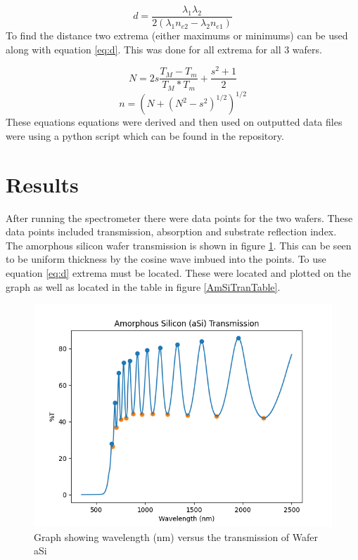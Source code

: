 \documentclass[10pt,a4paper]{article}
\begin{document}
\begin{multicols}{2}
\begin{equation}
\label{eq:d}
d = \frac{\lambda_1 \lambda_2}{2(\lambda_1 n_{e2} - \lambda_2 n_{e1})}
\end{equation}
To find the distance two extrema (either maximums or minimums) can be used along with equation \ref{eq:d}. This was done for all extrema for all 3 wafers.

\begin{equation}\label{eq:N}
N = 2s \frac{T_M -T_m}{T_M*T_m} + \frac{s^2+1}{2}
\end{equation}
\begin{equation}\label{eq:n}
n = (N + (N^2-s^2)^{1/2})^{1/2}
\end{equation}
These equations equations were derived and then used on outputted data files were using a python script which can be found in the repository.










\section*{Results}
After running the spectrometer there were data points for the two wafers. These data points included transmission, absorption and substrate reflection index.\\
The amorphous silicon wafer transmission is shown in figure \ref{AmSiTran}. This can be seen to be uniform thickness by the cosine wave imbued into the points. To use equation \ref{eq:d} extrema must be located. These were located and plotted on the graph as well as located in the table in figure \ref{AmSiTranTable}.

\begin{figure}[H]\label{AmSiTran}
\includegraphics[scale=0.5]{AmorphousSilicon}
\caption{Graph showing wavelength (nm) versus the transmission of Wafer aSi}
\end{figure}


\end{multicols}
\end{document}
